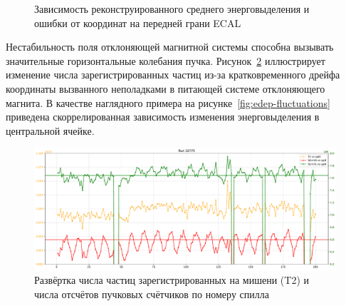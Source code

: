 \begin{figure}
    \caption{Зависимость реконструированного среднего энерговыделения и ошибки от координат на передней грани ECAL}
    \label{fig:ecal-cell-nonhomo}
\end{figure}

Нестабильность поля отклоняющей магнитной системы способна вызывать
значительные горизонтальные колебания пучка. Рисунок~\ref{fig:counts-fluctuating}
иллюстрирует изменение числа зарегистрированных частиц из-за
кратковременного дрейфа координаты вызванного неполадками в питающей
системе отклоняющего магнита. В качестве наглядного примера на
рисунке~\ref{fig:edep-fluctuations} приведена
скоррелированная зависимость изменения энерговыделения в центральной ячейке.

\begin{figure}
    \centering
    \includegraphics[width=0.95\linewidth]{images/illustrative/run-10775-t2-s0pv0-s2pv1.pdf}
    \caption{Развёртка числа частиц зарегистрированных на мишени (T2) и
    числа отсчётов пучковых счётчиков по номеру спилла}
    \label{fig:counts-fluctuating}
\end{figure}

